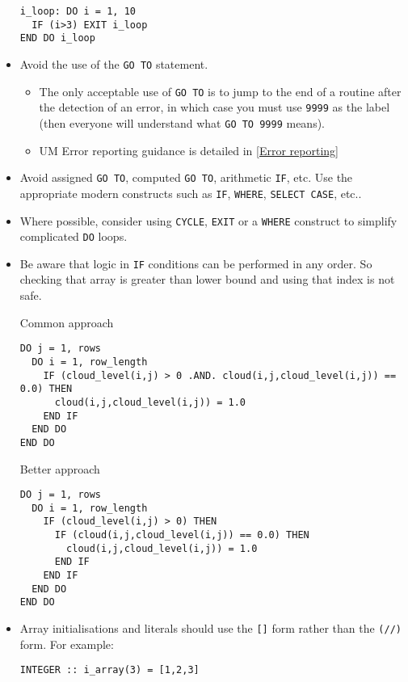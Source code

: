 \begin{itemize}
\begin{verbatim}
i_loop: DO i = 1, 10
  IF (i>3) EXIT i_loop
END DO i_loop
\end{verbatim}


\item Avoid the use of the \verb|GO TO| statement.
\begin{itemize}
        \item The only acceptable use of \verb|GO TO| is to jump to the end of a routine after the detection of an error, in which case you must use \verb|9999| as the label (then everyone will understand what \verb|GO TO 9999| means).
        \item UM Error reporting guidance is detailed in \ref{Error reporting}
\end{itemize}
\item Avoid assigned \verb|GO TO|, computed \verb|GO TO|, arithmetic
\verb|IF|, etc. Use the appropriate modern constructs such as \verb|IF|,
\verb|WHERE|, \verb|SELECT CASE|, etc..
\item Where possible, consider using \verb|CYCLE|, \verb|EXIT| or a
\verb|WHERE| construct to simplify complicated \verb|DO| loops.
\item Be aware that logic in \verb|IF| conditions can be performed in any order.  So checking that array is greater than lower bound and using that index is not safe.

Common approach
\begin{verbatim}
DO j = 1, rows
  DO i = 1, row_length
    IF (cloud_level(i,j) > 0 .AND. cloud(i,j,cloud_level(i,j)) == 0.0) THEN
      cloud(i,j,cloud_level(i,j)) = 1.0
    END IF
  END DO
END DO
\end{verbatim}

Better approach
\begin{verbatim}
DO j = 1, rows
  DO i = 1, row_length
    IF (cloud_level(i,j) > 0) THEN
      IF (cloud(i,j,cloud_level(i,j)) == 0.0) THEN
        cloud(i,j,cloud_level(i,j)) = 1.0
      END IF
    END IF
  END DO
END DO
\end{verbatim}

\item Array initialisations and literals should use the \verb|[]| form rather
      than the \verb|(//)| form. For example:

\begin{verbatim}
INTEGER :: i_array(3) = [1,2,3]
\end{verbatim}

\end{itemize}


